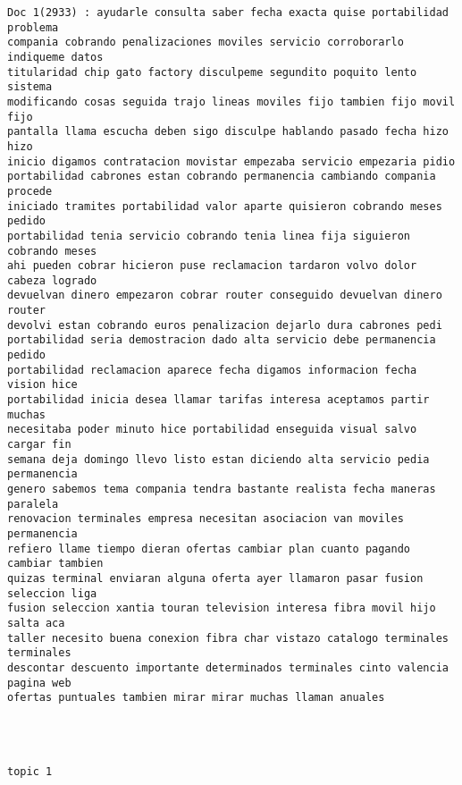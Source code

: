 \begin{Verbatim}[commandchars=\\\{\}]
Doc 1(2933) : ayudarle consulta saber fecha exacta quise portabilidad problema
compania cobrando penalizaciones moviles servicio corroborarlo indiqueme datos
titularidad chip gato factory disculpeme segundito poquito lento sistema
modificando cosas seguida trajo lineas moviles fijo tambien fijo movil fijo
pantalla llama escucha deben sigo disculpe hablando pasado fecha hizo hizo
inicio digamos contratacion movistar empezaba servicio empezaria pidio
portabilidad cabrones estan cobrando permanencia cambiando compania procede
iniciado tramites portabilidad valor aparte quisieron cobrando meses pedido
portabilidad tenia servicio cobrando tenia linea fija siguieron cobrando meses
ahi pueden cobrar hicieron puse reclamacion tardaron volvo dolor cabeza logrado
devuelvan dinero empezaron cobrar router conseguido devuelvan dinero router
devolvi estan cobrando euros penalizacion dejarlo dura cabrones pedi
portabilidad seria demostracion dado alta servicio debe permanencia pedido
portabilidad reclamacion aparece fecha digamos informacion fecha vision hice
portabilidad inicia desea llamar tarifas interesa aceptamos partir muchas
necesitaba poder minuto hice portabilidad enseguida visual salvo cargar fin
semana deja domingo llevo listo estan diciendo alta servicio pedia permanencia
genero sabemos tema compania tendra bastante realista fecha maneras paralela
renovacion terminales empresa necesitan asociacion van moviles permanencia
refiero llame tiempo dieran ofertas cambiar plan cuanto pagando cambiar tambien
quizas terminal enviaran alguna oferta ayer llamaron pasar fusion seleccion liga
fusion seleccion xantia touran television interesa fibra movil hijo salta aca
taller necesito buena conexion fibra char vistazo catalogo terminales terminales
descontar descuento importante determinados terminales cinto valencia pagina web
ofertas puntuales tambien mirar mirar muchas llaman anuales




topic 1


\end{Verbatim}
